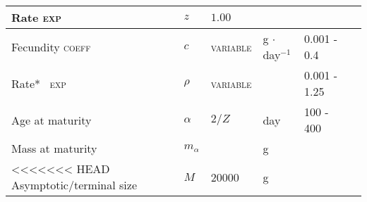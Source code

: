 \documentclass[a4paper]{article} %
\begin{document}
\begin{center}
\begin{minipage}{\linewidth}
\begin{table}[h]
\begin{tabularx}{\linewidth}{Xlllll}
    Rate           \qquad\qquad\quad\quad    \textsc{exp}     & $z$                   & $1.00$                    & \textsc{}             &                                   &                       \\ \hline
    Fecundity   \; \; \; \quad\quad\textsc{coeff}                         & $c$                   & \textsc{variable}         & g $\cdot$ day$^{-1}$  & 0.001 - 0.4                       & \textcite{Charnov2001}    \\  %
    Rate*       \; \; \ \quad\quad\quad\quad       \textsc{exp}     & $\rho$                & \textsc{variable}         & \textsc{}             & 0.001 - 1.25                      & \textcite{Barneche2018-reproductive_output}                      \\ \hline %
    Age at maturity                                         & $\alpha$              & $2/Z$                     & day                   & 100 - 400                         &                       \\ \hline
    Mass at maturity                                        & $m_{\alpha}$          &                           & g                     &                                   &                       \\ \hline
<<<<<<< HEAD
    Asymptotic/terminal size                                & $M$                   & 20000              & g                     &                                   &                       \\ \hline

\end{tabularx}
\end{table}
\end{minipage}
\end{center}
\end{document}
